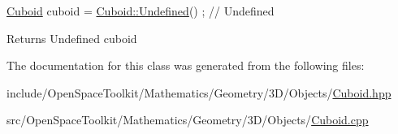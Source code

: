 \begin{DoxyCode}
\hyperlink{classostk_1_1math_1_1geom_1_1d3_1_1objects_1_1_cuboid_a1da071d7cbb0a694348628f098f77c5b}{Cuboid} cuboid = \hyperlink{classostk_1_1math_1_1geom_1_1d3_1_1objects_1_1_cuboid_aab6e643de544bd3de7529cc71a934f7a}{Cuboid::Undefined}() ; \textcolor{comment}{// Undefined}
\end{DoxyCode}


\begin{DoxyReturn}{Returns}
Undefined cuboid 
\end{DoxyReturn}


The documentation for this class was generated from the following files\+:\begin{DoxyCompactItemize}
\item 
include/\+Open\+Space\+Toolkit/\+Mathematics/\+Geometry/3\+D/\+Objects/\hyperlink{_cuboid_8hpp}{Cuboid.\+hpp}\item 
src/\+Open\+Space\+Toolkit/\+Mathematics/\+Geometry/3\+D/\+Objects/\hyperlink{_cuboid_8cpp}{Cuboid.\+cpp}\end{DoxyCompactItemize}
